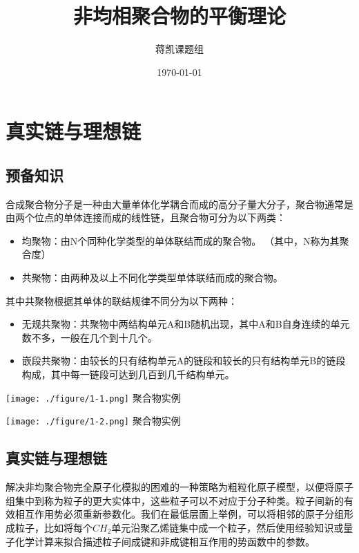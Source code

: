 \documentclass[UTF8]{ctexart}
\title{非均相聚合物的平衡理论}
\author{蒋凯课题组}
\date{\today}
\begin{document}
\maketitle


\newpage


\newpage
\section{真实链与理想链}
\subsection{预备知识}
合成聚合物分子是一种由大量单体化学耦合而成的高分子量大分子，聚合物通常是由两个位点的单体连接而成的线性链，且聚合物可分为以下两类：
\begin{itemize}
	\item 均聚物：由N个同种化学类型的单体联结而成的聚合物。
	（其中，N称为其聚合度）
	\item 共聚物：由两种及以上不同化学类型单体联结而成的聚合物。
\end{itemize}
其中共聚物根据其单体的联结规律不同分为以下两种：
\begin{itemize}
	\item 无规共聚物：共聚物中两结构单元A和B随机出现，其中A和B自身连续的单元数不多，一般在几个到十几个。
	\item 嵌段共聚物：由较长的只有结构单元A的链段和较长的只有结构单元B的链段构成，其中每一链段可达到几百到几千结构单元。
\end{itemize}

\begin{center}
	\texttt{[image: ./figure/1-1.png]}
聚合物实例

	\texttt{[image: ./figure/1-2.png]}
聚合物实例
\end{center}



\subsection{真实链与理想链}
解决非均聚合物完全原子化模拟的困难的一种策略为粗粒化原子模型，以便将原子组集中到称为粒子的更大实体中，这些粒子可以不对应于分子种类。粒子间新的有效相互作用势必须重新参数化。我们在最低层面上举例，可以将相邻的原子分组形成粒子，比如将每个$CH_2$单元沿聚乙烯链集中成一个粒子，然后使用经验知识或量子化学计算来拟合描述粒子间成键和非成键相互作用的势函数中的参数。
\end{document}
